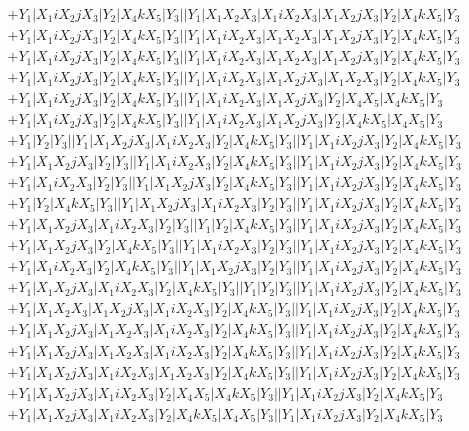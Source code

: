\documentclass{article}[12pt]
\begin{document}
 \begin{align*}
 & +Y_1|X_1iX_2jX_3|Y_2|X_4kX_5|Y_3||Y_1|X_1X_2X_3|X_1iX_2X_3|X_1X_2jX_3|Y_2|X_4kX_5|Y_3\\ 
 & +Y_1|X_1iX_2jX_3|Y_2|X_4kX_5|Y_3||Y_1|X_1iX_2X_3|X_1X_2X_3|X_1X_2jX_3|Y_2|X_4kX_5|Y_3\\ 
 & +Y_1|X_1iX_2jX_3|Y_2|X_4kX_5|Y_3||Y_1|X_1iX_2X_3|X_1X_2X_3|X_1X_2jX_3|Y_2|X_4kX_5|Y_3\\ 
 & +Y_1|X_1iX_2jX_3|Y_2|X_4kX_5|Y_3||Y_1|X_1iX_2X_3|X_1X_2jX_3|X_1X_2X_3|Y_2|X_4kX_5|Y_3\\ 
 & +Y_1|X_1iX_2jX_3|Y_2|X_4kX_5|Y_3||Y_1|X_1iX_2X_3|X_1X_2jX_3|Y_2|X_4X_5|X_4kX_5|Y_3\\ 
 & +Y_1|X_1iX_2jX_3|Y_2|X_4kX_5|Y_3||Y_1|X_1iX_2X_3|X_1X_2jX_3|Y_2|X_4kX_5|X_4X_5|Y_3\\ 
 & +Y_1|Y_2|Y_3||Y_1|X_1X_2jX_3|X_1iX_2X_3|Y_2|X_4kX_5|Y_3||Y_1|X_1iX_2jX_3|Y_2|X_4kX_5|Y_3\\ 
 & +Y_1|X_1X_2jX_3|Y_2|Y_3||Y_1|X_1iX_2X_3|Y_2|X_4kX_5|Y_3||Y_1|X_1iX_2jX_3|Y_2|X_4kX_5|Y_3\\ 
 & +Y_1|X_1iX_2X_3|Y_2|Y_3||Y_1|X_1X_2jX_3|Y_2|X_4kX_5|Y_3||Y_1|X_1iX_2jX_3|Y_2|X_4kX_5|Y_3\\ 
 & +Y_1|Y_2|X_4kX_5|Y_3||Y_1|X_1X_2jX_3|X_1iX_2X_3|Y_2|Y_3||Y_1|X_1iX_2jX_3|Y_2|X_4kX_5|Y_3\\ 
 & +Y_1|X_1X_2jX_3|X_1iX_2X_3|Y_2|Y_3||Y_1|Y_2|X_4kX_5|Y_3||Y_1|X_1iX_2jX_3|Y_2|X_4kX_5|Y_3\\ 
 & +Y_1|X_1X_2jX_3|Y_2|X_4kX_5|Y_3||Y_1|X_1iX_2X_3|Y_2|Y_3||Y_1|X_1iX_2jX_3|Y_2|X_4kX_5|Y_3\\ 
 & +Y_1|X_1iX_2X_3|Y_2|X_4kX_5|Y_3||Y_1|X_1X_2jX_3|Y_2|Y_3||Y_1|X_1iX_2jX_3|Y_2|X_4kX_5|Y_3\\ 
 & +Y_1|X_1X_2jX_3|X_1iX_2X_3|Y_2|X_4kX_5|Y_3||Y_1|Y_2|Y_3||Y_1|X_1iX_2jX_3|Y_2|X_4kX_5|Y_3\\ 
 & +Y_1|X_1X_2X_3|X_1X_2jX_3|X_1iX_2X_3|Y_2|X_4kX_5|Y_3||Y_1|X_1iX_2jX_3|Y_2|X_4kX_5|Y_3\\ 
 & +Y_1|X_1X_2jX_3|X_1X_2X_3|X_1iX_2X_3|Y_2|X_4kX_5|Y_3||Y_1|X_1iX_2jX_3|Y_2|X_4kX_5|Y_3\\ 
 & +Y_1|X_1X_2jX_3|X_1X_2X_3|X_1iX_2X_3|Y_2|X_4kX_5|Y_3||Y_1|X_1iX_2jX_3|Y_2|X_4kX_5|Y_3\\ 
 & +Y_1|X_1X_2jX_3|X_1iX_2X_3|X_1X_2X_3|Y_2|X_4kX_5|Y_3||Y_1|X_1iX_2jX_3|Y_2|X_4kX_5|Y_3\\ 
 & +Y_1|X_1X_2jX_3|X_1iX_2X_3|Y_2|X_4X_5|X_4kX_5|Y_3||Y_1|X_1iX_2jX_3|Y_2|X_4kX_5|Y_3\\ 
 & +Y_1|X_1X_2jX_3|X_1iX_2X_3|Y_2|X_4kX_5|X_4X_5|Y_3||Y_1|X_1iX_2jX_3|Y_2|X_4kX_5|Y_3\\ 

\end{align*}
\end{document}
